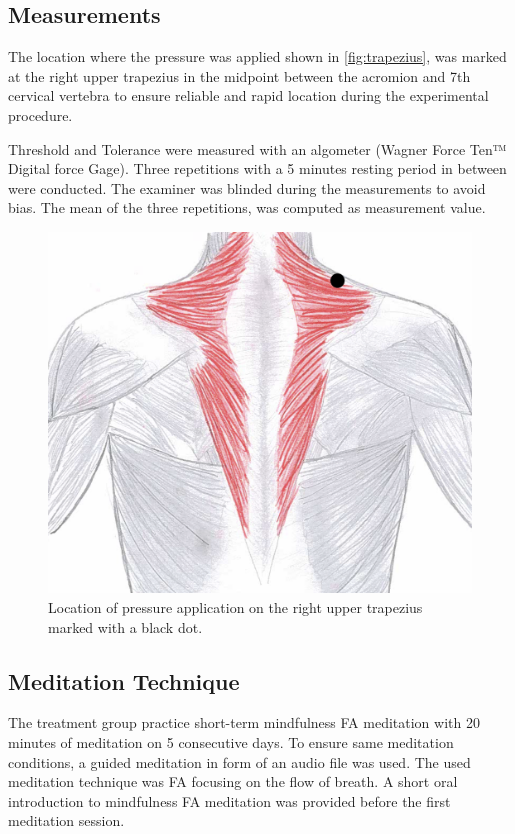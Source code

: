 \subsection{Measurements}%
The location where the pressure was applied shown in \autoref{fig:trapezius}, was marked at the right upper trapezius in the midpoint between the acromion and 7th cervical vertebra to ensure reliable and rapid location during the experimental procedure. 

Threshold and Tolerance were measured with an algometer (Wagner Force Ten™ Digital force Gage). Three repetitions with a 5 minutes resting period in between were conducted. The examiner was blinded during the measurements to avoid bias. The mean of the three repetitions, was computed as measurement value. 

\begin{figure}[H]
\centering
\includegraphics[width=.7\columnwidth]{../figures/trapezius}
\caption{Location of pressure application on the right upper trapezius marked with a black dot.}
\label{fig:trapezius}
\end{figure} \vspace{-.5cm}


\subsection{Meditation Technique}
The treatment group practice short-term mindfulness FA meditation with 20 minutes of meditation on 5 consecutive days. To ensure same meditation conditions, a guided meditation in form of an audio file was used. The used meditation technique was FA focusing on the flow of breath. A short oral introduction to mindfulness FA meditation was provided before the first meditation session. 

